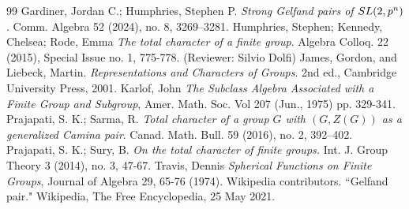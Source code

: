 \documentclass[10pt,a4paper]{amsart}
\theoremstyle{plain}
\theoremstyle{definition}
\numberwithin{equation}{section}
\begin{document}
\begin{thebibliography}{99}
 Gardiner, Jordan C.; Humphries, Stephen P. \emph{Strong Gelfand pairs of ${\rm SL}(2,p^n)$}. Comm. Algebra 52 (2024), no. 8, 3269--3281.
 Humphries, Stephen; Kennedy, Chelsea; Rode, Emma \emph{The total character of a finite group}. Algebra Colloq. 22 (2015), Special Issue no. 1, 775-778. (Reviewer: Silvio Dolfi)
 James, Gordon, and Liebeck, Martin. \emph{Representations and Characters of Groups}. 2nd ed., Cambridge University Press, 2001.
 Karlof, John \emph{The Subclass Algebra Associated with a Finite Group and Subgroup}, Amer. Math. Soc. Vol 207 (Jun., 1975) pp. 329-341.
 Prajapati, S. K.; Sarma, R. \emph{Total character of a group $G$ with $(G, Z(G))$ as a generalized Camina pair}. Canad. Math. Bull. 59 (2016), no. 2, 392--402.
 Prajapati, S. K.; Sury, B. \emph{On the total character of finite groups.} Int. J. Group Theory 3 (2014), no. 3, 47-67.
 Travis, Dennis \emph{Spherical Functions on Finite Groups}, Journal of Algebra 29, 65-76 (1974).
 Wikipedia contributors. ``Gelfand pair." Wikipedia, The Free Encyclopedia, 25 May 2021.
\end{thebibliography}
\end{document}
